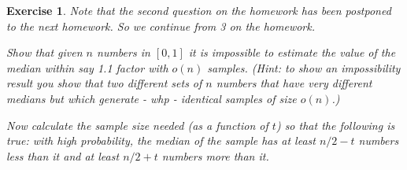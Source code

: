 \documentclass[12pt]{article}
\theoremstyle{colon}
\newtheorem{exercise}{Exercise}
\begin{document}
\clearpage

\begin{exercise}
  Note that the second question on the homework has been postponed to the next homework. So we continue from 3 on the homework.

  Show that given $n$ numbers in $[0,1]$ it is impossible to estimate the \textit{value} of the median within say 1.1 factor with $o(n)$ samples. (Hint: to show an impossibility result you show that two different sets of $n$ numbers that have very different medians but which generate - whp - identical samples of size $o(n)$.)

  Now calculate the sample size needed (as a function of $t$) so that the following is true: with high probability, the median of the sample has at least $n/2 -t$ numbers less than it and at least $n/2 + t$ numbers more than it.
\end{exercise}
\end{document}
